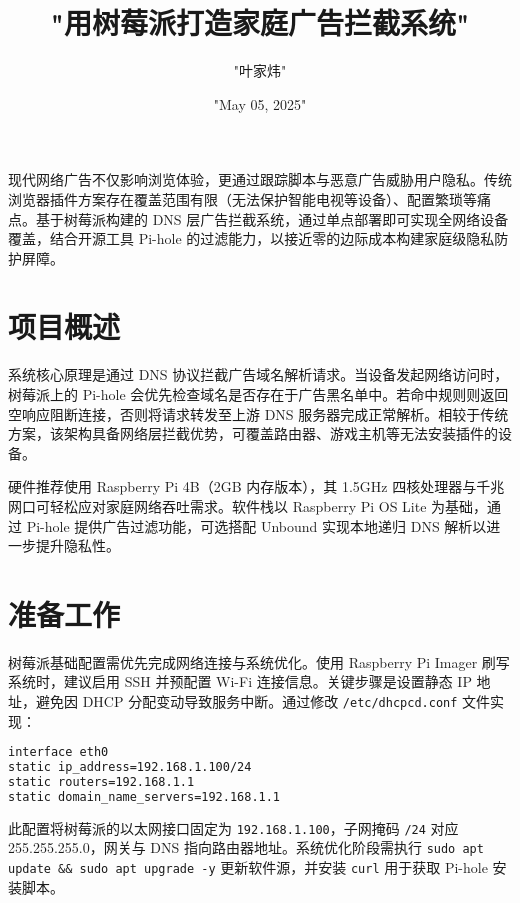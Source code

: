 \title{"用树莓派打造家庭广告拦截系统"}
\author{"叶家炜"}
\date{"May 05, 2025"}
\maketitle
现代网络广告不仅影响浏览体验，更通过跟踪脚本与恶意广告威胁用户隐私。传统浏览器插件方案存在覆盖范围有限（无法保护智能电视等设备）、配置繁琐等痛点。基于树莓派构建的 DNS 层广告拦截系统，通过单点部署即可实现全网络设备覆盖，结合开源工具 Pi-hole 的过滤能力，以接近零的边际成本构建家庭级隐私防护屏障。\par
\chapter{项目概述}
系统核心原理是通过 DNS 协议拦截广告域名解析请求。当设备发起网络访问时，树莓派上的 Pi-hole 会优先检查域名是否存在于广告黑名单中。若命中规则则返回空响应阻断连接，否则将请求转发至上游 DNS 服务器完成正常解析。相较于传统方案，该架构具备网络层拦截优势，可覆盖路由器、游戏主机等无法安装插件的设备。\par
硬件推荐使用 Raspberry Pi 4B（2GB 内存版本），其 1.5GHz 四核处理器与千兆网口可轻松应对家庭网络吞吐需求。软件栈以 Raspberry Pi OS Lite 为基础，通过 Pi-hole 提供广告过滤功能，可选搭配 Unbound 实现本地递归 DNS 解析以进一步提升隐私性。\par
\chapter{准备工作}
树莓派基础配置需优先完成网络连接与系统优化。使用 Raspberry Pi Imager 刷写系统时，建议启用 SSH 并预配置 Wi-Fi 连接信息。关键步骤是设置静态 IP 地址，避免因 DHCP 分配变动导致服务中断。通过修改 \verb!/etc/dhcpcd.conf! 文件实现：\par
\begin{lstlisting}[language=bash]
interface eth0
static ip_address=192.168.1.100/24
static routers=192.168.1.1
static domain_name_servers=192.168.1.1
\end{lstlisting}
此配置将树莓派的以太网接口固定为 \verb!192.168.1.100!，子网掩码 \verb!/24! 对应 255.255.255.0，网关与 DNS 指向路由器地址。系统优化阶段需执行 \verb!sudo apt update && sudo apt upgrade -y! 更新软件源，并安装 \verb!curl! 用于获取 Pi-hole 安装脚本。\par
